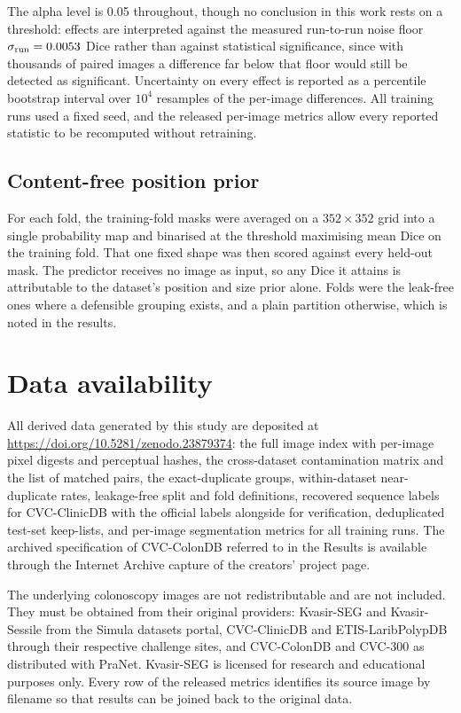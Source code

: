 \documentclass[11pt]{article}
\begin{document}
The alpha level is 0.05 throughout, though no conclusion in this work rests
on a threshold: effects are interpreted against the measured run-to-run noise
floor $\sigma_{\mathrm{run}} = 0.0053{}$ Dice rather than against
statistical significance, since with thousands of paired images a difference
far below that floor would still be detected as significant. Uncertainty on
every effect is reported as a percentile bootstrap interval over $10^4$
resamples of the per-image differences. All training runs used a fixed seed,
and the released per-image metrics allow every reported statistic to be
recomputed without retraining.

\subsection*{Content-free position prior}
For each fold, the training-fold masks were averaged on a $352 \times 352$
grid into a single probability map and binarised at the threshold maximising
mean Dice on the training fold. That one fixed shape was then scored against
every held-out mask. The predictor receives no image as input, so any Dice it
attains is attributable to the dataset's position and size prior alone.
Folds were the leak-free ones where a defensible grouping exists, and a plain
partition otherwise, which is noted in the results.

\section*{Data availability}

All derived data generated by this study are deposited at
\url{https://doi.org/10.5281/zenodo.23879374}: the full image index with
per-image pixel digests and
perceptual hashes, the cross-dataset contamination matrix and the list of
matched pairs, the exact-duplicate groups, within-dataset near-duplicate
rates, leakage-free split and fold definitions, recovered sequence labels for
CVC-ClinicDB with the official labels alongside for verification,
deduplicated test-set keep-lists, and per-image segmentation metrics for all
\NRuns{} training runs. The archived specification of CVC-ColonDB referred to
in the Results is available through the Internet Archive capture of the
creators' project page.

The underlying colonoscopy images are not redistributable and are not
included. They must be obtained from their original providers: Kvasir-SEG and
Kvasir-Sessile from the Simula datasets portal, CVC-ClinicDB and
ETIS-LaribPolypDB through their respective challenge sites, and CVC-ColonDB
and CVC-300 as distributed with PraNet. Kvasir-SEG is licensed for research
and educational purposes only. Every row of the released metrics identifies
its source image by filename so that results can be joined back to the
original data.
\end{document}
